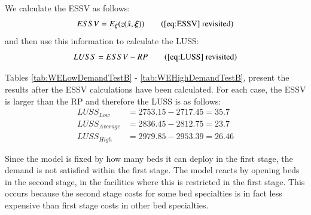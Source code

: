 \documentclass[../thesis.tex]{subfiles}
\begin{document}
{We calculate the ESSV as follows:
\begin{equation}
    ESSV = E_{\boldsymbol{\xi}}(z(\hat x, \boldsymbol{\xi})) \tag{\ref{eq:ESSV} revisited} 
\end{equation}
and then use this information to calculate the LUSS:
\begin{equation}
    LUSS = ESSV - RP\tag{\ref{eq:LUSS} revisited}
\end{equation}

Tables \ref{tab:WELowDemandTestB} - \ref{tab:WEHighDemandTestB}, present the results after the ESSV calculations have been calculated. For each case, the ESSV is larger than the RP and therefore the LUSS is as follows:
\vspace{-0.25cm}
\begin{align}
    LUSS_{Low} & = 2753.15 - 2717.45 = 35.7\\
    LUSS_{Average} & = 2836.45 - 2812.75 = 23.7\\
    LUSS_{High} & = 2979.85 - 2953.39  = 26.46
\end{align}

Since the model is fixed by how many beds it can deploy in the first stage, the demand is not satisfied within the first stage. The model reacts by opening beds in the second stage, in the facilities where this is restricted in the first stage. This occurs because the second stage costs for some bed specialties is in fact less expensive than first stage costs in other bed specialties.


\begin{table}[h!]
    \centering{}
    \caption{Low Demand Worked Example where results are recorded [(beds), (staff)] - Test B Results}
    \label{tab:WELowDemandTestB}
\end{table}

}
\end{document}
